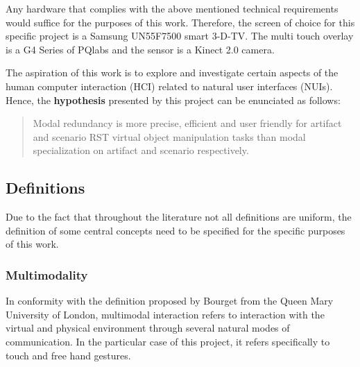 \documentclass[12pt]{extarticle}
\begin{document}
Any hardware that complies with the above mentioned technical requirements would suffice for the purposes of this work. Therefore, the screen of choice for this specific project is a Samsung UN55F7500 smart 3-D-TV. The multi touch overlay is a G4 Series of PQlabs and the sensor is a Kinect 2.0 camera.

The aspiration of this work is to explore and investigate certain aspects of the human computer interaction (HCI) related to natural user interfaces (NUIs). Hence, the \textbf{hypothesis} presented by this project can be enunciated as follows:

\begin{quotation}
Modal redundancy is more precise, efficient and user friendly for artifact and scenario RST virtual object manipulation tasks than modal specialization on artifact and scenario respectively.
\end{quotation}



\subsection{Definitions}
Due to the fact that throughout the literature not all definitions are uniform, the definition of some central concepts need to be specified for the specific purposes of this work.

\subsubsection {Multimodality}
In conformity with the definition proposed by Bourget \cite{multimodality} from the Queen Mary University of London, multimodal interaction refers to interaction with the virtual and physical environment through several natural modes of communication. In the particular case of this project, it refers specifically to touch and free hand gestures.
\end{document}
